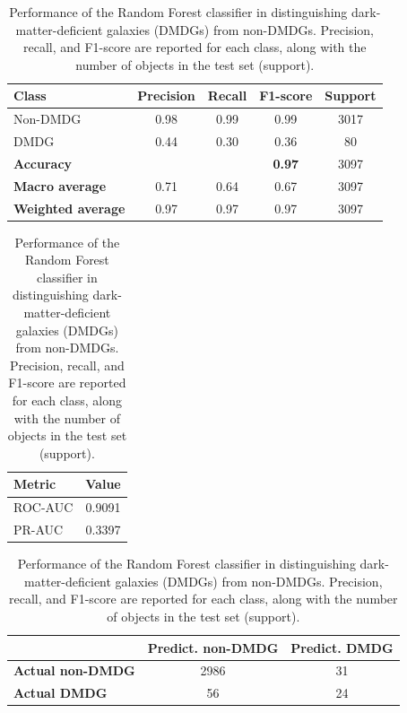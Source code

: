\documentclass[twocolumn]{openjournal}
\begin{document}
\begin{table}[ht]
\centering
\caption{Performance of the Random Forest classifier in distinguishing dark-matter-deficient galaxies (DMDGs) from non-DMDGs. Precision, recall, and F1-score are reported for each class, along with the number of objects in the test set (support).}
\label{rf classification}
\begin{tabular}{lcccc}
\hline
\textbf{Class} & \textbf{Precision} & \textbf{Recall} & \textbf{F1-score} & \textbf{Support} \\
\hline
Non-DMDG & 0.98 & 0.99 & 0.99 & 3017 \\
DMDG & 0.44 & 0.30 & 0.36 & 80 \\
\hline
\textbf{Accuracy} & & & \textbf{0.97} & 3097 \\
\textbf{Macro average} & 0.71 & 0.64 & 0.67 & 3097 \\
\textbf{Weighted average} & 0.97 & 0.97 & 0.97 & 3097 \\
\hline
\end{tabular}
\begin{tabular}{lc}
\hline
\textbf{Metric} & \textbf{Value} \\
\hline
ROC-AUC & 0.9091 \\
PR-AUC & 0.3397 \\
\hline
\end{tabular}
\begin{tabular}{lcc}
\hline
 & \textbf{Predict. non-DMDG} & \textbf{Predict. DMDG} \\
\hline
\textbf{Actual non-DMDG} & 2986 & 31 \\
\textbf{Actual DMDG} & 56 & 24 \\
\hline
\end{tabular}
\end{table}
\end{document}
